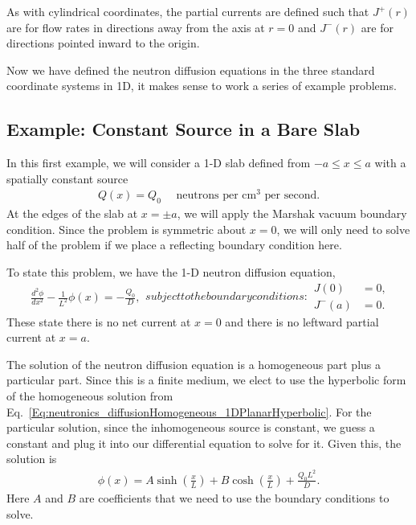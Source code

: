 As with cylindrical coordinates, the partial currents are defined such that $J^+(r)$ are for flow rates in directions away from the axis at $r = 0$ and $J^-(r)$ are for directions pointed inward to the origin.

Now we have defined the neutron diffusion equations in the three standard coordinate systems in 1D, it makes sense to work a series of example problems.

\subsection{Example: Constant Source in a Bare Slab}

In this first example, we will consider a 1-D slab defined from $-a \le x \le a$ with a spatially constant source
\begin{align}
  Q(x) = Q_0 \quad \text{ neutrons per cm$^3$ per second.}
\end{align}
At the edges of the slab at $x = \pm a$, we will apply the Marshak vacuum boundary condition. Since the problem is symmetric about $x = 0$, we will only need to solve half of the problem if we place a reflecting boundary condition here.

To state this problem, we have the 1-D neutron diffusion equation,
\begin{subequations}
\begin{align}
  \frac{d^2 \phi}{dx^2} - \frac{1}{L^2} \phi(x) = -\frac{Q_0}{D},
\end{align}
subject to the boundary conditions:
\begin{align}
  J(0) 		&= 0, \\
  J^-(a) 	&= 0.
\end{align}
\end{subequations}
These state there is no net current at $x = 0$ and there is no leftward partial current at $x = a$.

The solution of the neutron diffusion equation is a homogeneous part plus a particular part. Since this is a finite medium, we elect to use the hyperbolic form of the homogeneous solution from Eq.~\eqref{Eq:neutronics_diffusionHomogeneous_1DPlanarHyperbolic}. For the particular solution, since the inhomogeneous source is constant, we guess a constant and plug it into our differential equation to solve for it. Given this, the solution is
\begin{align}
  \phi(x) = A \sinh\left( \frac{x}{L} \right) + B \cosh\left( \frac{x}{L} \right) + \frac{ Q_0 L^2 }{ D } .
\end{align}
Here $A$ and $B$ are coefficients that we need to use the boundary conditions to solve.

